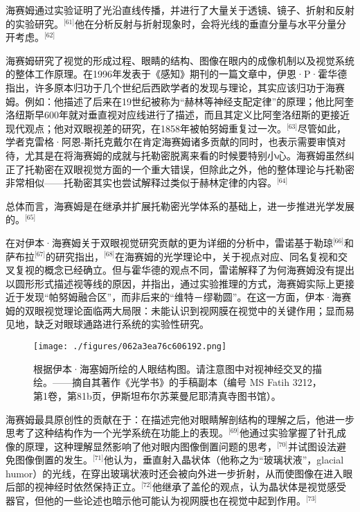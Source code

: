 海赛姆通过实验证明了光沿直线传播，并进行了大量关于透镜、镜子、折射和反射的实验研究。\(^\text{[61]}\)他在分析反射与折射现象时，会将光线的垂直分量与水平分量分开考虑。\(^\text{[62]}\)

海赛姆研究了视觉的形成过程、眼睛的结构、图像在眼内的成像机制以及视觉系统的整体工作原理。在1996年发表于《感知》期刊的一篇文章中，伊恩·P·霍华德指出，许多原本归功于几个世纪后西欧学者的发现与理论，其实应该归功于海赛姆。例如：他描述了后来在19世纪被称为“赫林等神经支配定律”的原理；他比阿奎洛纽斯早600年就对垂直视对应线进行了描述，而且其定义比阿奎洛纽斯的更接近现代观点；他对双眼视差的研究，在1858年被帕努姆重复过一次。\(^\text{[63]}\)尽管如此，学者克雷格·阿恩-斯托克戴尔在肯定海赛姆诸多贡献的同时，也表示需要审慎对待，尤其是在将海赛姆的成就与托勒密脱离来看的时候要特别小心。海赛姆虽然纠正了托勒密在双眼视觉方面的一个重大错误，但除此之外，他的整体理论与托勒密非常相似——托勒密其实也尝试解释过类似于赫林定律的内容。\(^\text{[64]}\)

总体而言，海赛姆是在继承并扩展托勒密光学体系的基础上，进一步推进光学发展的。\(^\text{[65]}\)

在对伊本·海赛姆关于双眼视觉研究贡献的更为详细的分析中，雷诺基于勒琼\(^\text{[66]}\)和萨布拉\(^\text{[67]}\)的研究指出，\(^\text{[68]}\)在海赛姆的光学理论中，关于视点对应、同名复视和交叉复视的概念已经确立。但与霍华德的观点不同，雷诺解释了为何海赛姆没有提出以圆形形式描述视等线的原因，并指出，通过实验推理的方式，海赛姆实际上更接近于发现“帕努姆融合区”，而非后来的“维特－缪勒圆”。在这一方面，伊本·海赛姆的双眼视觉理论面临两大局限：未能认识到视网膜在视觉中的关键作用；显而易见地，缺乏对眼球通路进行系统的实验性研究。
\begin{figure}[ht]
\centering
\texttt{[image: ./figures/062a3ea76c606192.png]}
\caption{根据伊本·海塞姆所绘的人眼结构图。请注意图中对视神经交叉的描绘。——摘自其著作《光学书》的手稿副本（编号 MS Fatih 3212，第1卷，第81b页，伊斯坦布尔苏莱曼尼耶清真寺图书馆）。} \label{fig_YBH_2}
\end{figure}
海赛姆最具原创性的贡献在于：在描述完他对眼睛解剖结构的理解之后，他进一步思考了这种结构作为一个光学系统在功能上的表现。\(^\text{[69]}\)他通过实验掌握了针孔成像的原理，这种理解显然影响了他对眼内图像倒置问题的思考，\(^\text{[70]}\)并试图设法避免图像倒置的发生。\(^\text{[71]}\)他认为，垂直射入晶状体（他称之为“玻璃状液”，glacial humor）的光线，在穿出玻璃状液时还会被向外进一步折射，从而使图像在进入眼后部的视神经时依然保持正立。\(^\text{[72]}\)他继承了盖伦的观点，认为晶状体是视觉感受器官，但他的一些论述也暗示他可能认为视网膜也在视觉中起到作用。\(^\text{[73]}\)

